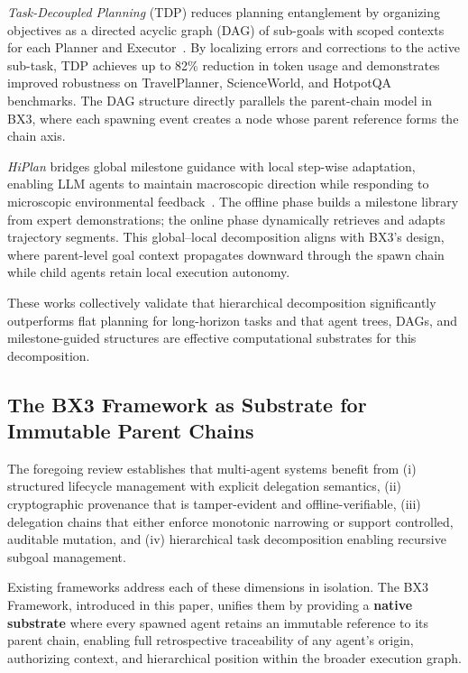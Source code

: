 \textit{Task-Decoupled Planning} (TDP) reduces planning entanglement by organizing objectives as a directed acyclic graph (DAG) of sub-goals with scoped contexts for each Planner and Executor~\cite{arXiv2601.07577}. By localizing errors and corrections to the active sub-task, TDP achieves up to 82\% reduction in token usage and demonstrates improved robustness on TravelPlanner, ScienceWorld, and HotpotQA benchmarks. The DAG structure directly parallels the parent-chain model in BX3, where each spawning event creates a node whose parent reference forms the chain axis.

\textit{HiPlan} bridges global milestone guidance with local step-wise adaptation, enabling LLM agents to maintain macroscopic direction while responding to microscopic environmental feedback~\cite{arXiv2508.19076}. The offline phase builds a milestone library from expert demonstrations; the online phase dynamically retrieves and adapts trajectory segments. This global--local decomposition aligns with BX3's design, where parent-level goal context propagates downward through the spawn chain while child agents retain local execution autonomy.

These works collectively validate that hierarchical decomposition significantly outperforms flat planning for long-horizon tasks and that agent trees, DAGs, and milestone-guided structures are effective computational substrates for this decomposition.

\subsection{The BX3 Framework as Substrate for Immutable Parent Chains}
\label{sec:bx3-framework}

The foregoing review establishes that multi-agent systems benefit from (i) structured lifecycle management with explicit delegation semantics, (ii) cryptographic provenance that is tamper-evident and offline-verifiable, (iii) delegation chains that either enforce monotonic narrowing or support controlled, auditable mutation, and (iv) hierarchical task decomposition enabling recursive subgoal management.

Existing frameworks address each of these dimensions in isolation. The BX3 Framework, introduced in this paper, unifies them by providing a \textbf{native substrate} where every spawned agent retains an immutable reference to its parent chain, enabling full retrospective traceability of any agent's origin, authorizing context, and hierarchical position within the broader execution graph.

